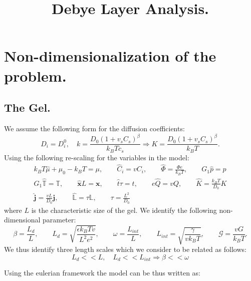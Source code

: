 \documentclass[12pt]{extarticle}
\title{Debye Layer Analysis.}
\author{}
\newcommand{\LL}{\ensuremath{\mathbb{L}}}
\begin{document}
\section{Non-dimensionalization of the problem.}
\subsection{The Gel.}
We assume the following form for the diffusion coefficients:
\begin{equation}
D_i=D_i^0,\quad k = \frac{D_0(1+v_sC_s)^\beta}{k_B T c_s} \Rightarrow K=  \frac{D_0(1+v_sC_s)^\beta}{k_B T}.
\end{equation}
Using the following re-scaling for the variables in the model:
\begin{equation*}
\begin{aligned}
k_BT\hat{\mu} + \mu_0 -k_BT= \mu, \qquad \hat{C}_i = vC_i, \qquad \hat{\Phi} = \frac{\Phi e}{k_B T}, \qquad  G_1\hat{p}= p\\
G_1\hat{\mathbb{T}}=\mathbb{T}, \qquad\hat{\mathbf{x}} L =\mathbf{x}, \qquad \hat{t}\tau=t, \qquad e\hat{Q} =v Q, \qquad \hat{K} = \frac{k_BT}{D_0}K\\
\hat{\mathbf{j}}=\frac{vL}{D_0}\mathbf{j}, \qquad \hat{\LL}= \tau \LL, \qquad \tau=\frac{L^2}{D_0}
\end{aligned}
\end{equation*}
where $L$ is the characteristic size of the gel. We identify the following non-dimensional parameter:
\begin{equation*}
\beta=\frac{L_d}{L}, \qquad L_d= \sqrt{\frac{\epsilon k_B Tv}{L^2e^2}}, \qquad \omega= \frac{L_{int}}{L}, \qquad L_{int}=\sqrt{\frac{\gamma}{vk_BT}}, \qquad \mathcal{G}=\frac{vG}{k_BT}.
\end{equation*}
We thus identify three length scales which we consider to be related as follows:
\begin{equation}
L_d<<L, \quad L_d<<L_{int} \Rightarrow \beta<<\omega
\end{equation}

Using the eulerian framework the model can be thus written as:
\end{document}
